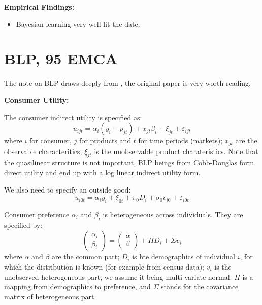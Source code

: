 \documentclass{book}
\theoremstyle{plain}
\theoremstyle{definition}
\begin{document}
\noindent
\textbf{Empirical Findings:}
\begin{itemize}
	\item Bayesian learning very well fit the date.

\end{itemize}




\section{BLP, 95 EMCA} %
\label{sec:blp_95_emca}

The note on BLP draws deeply from \cite{Nevo:2000gn}, the original paper \cite{berry.et.al.1995.emca} is very worth reading.

\textbf{Consumer Utility:}

The consumer indirect utility is specified as:
\[u _ { i j t } = \alpha _ { i } \left( y _ { i } - p _ { j t } \right) + x _ { j t } \beta _ { i } + \xi _ { j t } + \varepsilon _ { i j t } \]
where $i$ for consumer, $j$ for products and $t$ for time periods (markets); $ x_{jt}$ are the observable characteritics, $\xi_{jt}$ is the unobservable product charateristics. Note that the quasilinear structure is not important, BLP beings from Cobb-Douglas form direct utility and end up with a log linear indirect utility form.


We also need to specify an outside good:
\[u _ { i 0 t } = \alpha _ { i } y _ { i } + \xi _ { 0 t } + \pi _ { 0 } D _ { i } + \sigma _ { 0 } v _ { i 0 } + \varepsilon _ { i 0 t }\]

Consumer preference $\alpha_i$ and $\beta_i$ is heterogeneous across individuals. They are specified by:
\[\left( \begin{array} { l } { \alpha _ { i } } \\ { \beta _ { i } } \end{array} \right) = \left( \begin{array} { l } { \alpha } \\ { \beta } \end{array} \right) + \Pi D _ { i } + \Sigma v _ { i }\]
where $\alpha$ and $\beta$ are the common part; $D_i$ is hte demographics of individual $i$, for which the distribution is known (for example from census data); $v_i$ is the unobserved heterogeneous part, we assume it being multi-variate normal. $\Pi$ is a mapping from demographics to preference, and $\Sigma$ stands for the covariance matrix of heterogeneous part.
\end{document}
